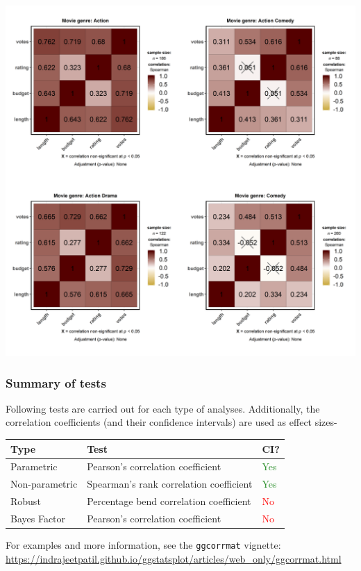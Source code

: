 \documentclass[]{article}
\begin{document}
\includegraphics[width=1\linewidth]{./figures/paper-ggcorrmat3-1}

\hypertarget{summary-of-tests-7}{%
\subsubsection{Summary of tests}\label{summary-of-tests-7}}

Following tests are carried out for each type of analyses. Additionally,
the correlation coefficients (and their confidence intervals) are used
as effect sizes-

\begin{longtable}[]{@{}lll@{}}
\toprule
Type & Test & CI?\tabularnewline
\midrule
\endhead
Parametric & Pearson's correlation coefficient &
\textcolor{ForestGreen}{Yes}\tabularnewline
Non-parametric & Spearman's rank correlation coefficient &
\textcolor{ForestGreen}{Yes}\tabularnewline
Robust & Percentage bend correlation coefficient &
\textcolor{red}{No}\tabularnewline
Bayes Factor & Pearson's correlation coefficient &
\textcolor{red}{No}\tabularnewline
\bottomrule
\end{longtable}

For examples and more information, see the \texttt{ggcorrmat} vignette:
\url{https://indrajeetpatil.github.io/ggstatsplot/articles/web_only/ggcorrmat.html}
\end{document}
